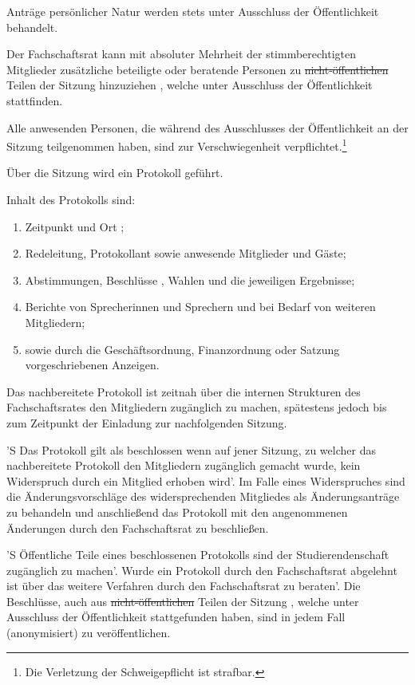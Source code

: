 \documentclass[%
	parskip=half,
]{scrartcl}
\newcommand{\edit}[1]{{\color{red} #1}}
\newcommand{\add}[1]{{\color{blue} #1}}
\newcommand{\delete}[1]{{\color{red} \sout{#1}}}
\begin{document}
\begin{contract}
Anträge persönlicher Natur werden stets \edit{unter Ausschluss der Öffentlichkeit} behandelt.

Der Fachschaftsrat kann mit absoluter Mehrheit der stimmberechtigten Mitglieder zusätzliche beteiligte oder beratende 
Personen zu \delete{nicht-öffentlichen} Teilen der Sitzung hinzuziehen\add{, welche unter Ausschluss der Öffentlichkeit 
stattfinden}.

\edit{Alle anwesenden Personen, die während des Ausschlusses der Öffentlichkeit an der Sitzung teilgenommen haben, sind 
zur Verschwiegenheit verpflichtet.}\footnote{\add{Die Verletzung der Schweigepflicht ist strafbar.}}


Über die Sitzung wird ein Protokoll geführt.

Inhalt des Protokolls sind:
\begin{enumerate}[\qquad a)]
	\item \add{Zeitpunkt und} Ort\edit{;}
	\item \edit{Rede}leitung, Protokollant sowie anwesende Mitglieder und Gäste;
	\item Abstimmungen, Beschlüsse\add{, Wahlen} und die jeweiligen Ergebnisse;
	\item Berichte von \edit{Sprecherinnen und Sprechern} \add{und bei Bedarf von weiteren Mitgliedern};
	\item sowie durch die Geschäftsordnung, Finanzordnung oder Satzung vorgeschriebenen Anzeigen.
\end{enumerate}

Das nachbereitete Protokoll ist zeitnah über die internen Strukturen des Fachschaftsrates den Mitgliedern zugänglich zu 
machen, spätestens jedoch bis zum Zeitpunkt der Einladung zur nachfolgenden Sitzung.

'S Das Protokoll gilt als beschlossen wenn auf jener Sitzung, zu welcher das nachbereitete Protokoll den Mitgliedern 
zugänglich gemacht wurde, kein Widerspruch durch ein Mitglied erhoben wird'. Im Falle eines Widerspruches sind die 
Änderungsvorschläge des widersprechenden Mitgliedes als Änderungsanträge zu behandeln und anschließend das Protokoll 
mit den angenommenen Änderungen durch den Fachschaftsrat zu beschließen.

'S Öffentliche Teile eines beschlossenen Protokolls sind der Studierendenschaft zugänglich zu machen'. Wurde ein 
Protokoll durch den Fachschaftsrat abgelehnt ist über das weitere Verfahren durch den Fachschaftsrat zu beraten'. Die 
Beschlüsse, auch aus \delete{nicht-öffentlichen} Teilen der Sitzung\add{, welche unter Ausschluss der Öffentlichkeit 
stattgefunden haben}, sind in jedem Fall (anonymisiert) zu veröffentlichen.


\end{contract}
\end{document}
